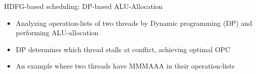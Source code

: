 \documentclass{beamer}
\begin{document}
\begin{CJK}{UTF8}{bkai}
    \begin{frame}{HDFG-based scheduling: DP-based ALU-Allocation}
        \begin{itemize}
            \item Analyzing operation-lists of two threads by Dynamic programming (DP) and performing ALU-allocation
            \item DP determines which thread stalls at conflict, achieving optimal OPC
            \item An example where two threads have MMMAAA in their operation-lists
        \end{itemize}
        \begin{figure}[!ht]
            \begin{center}
                \hfill
                \hfill
            \end{center}
            \label{fig:alloc}
        \end{figure}
    \end{frame}


\end{CJK}
\end{document}
